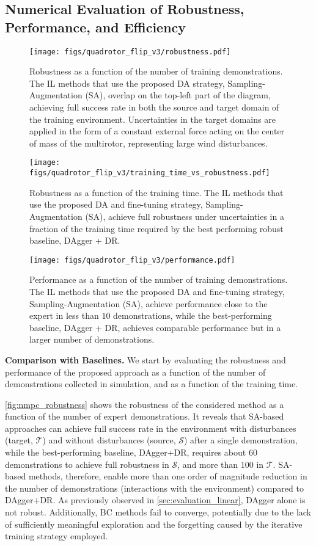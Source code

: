 \subsection{Numerical Evaluation of Robustness, Performance, and Efficiency} 
\begin{figure}
    \centering
    \texttt{[image: figs/quadrotor\_flip\_v3/robustness.pdf]}
    \caption{Robustness as a function of the number of training demonstrations. The \ac{IL} methods that use the proposed \ac{DA} strategy, Sampling-Augmentation (SA), overlap on the top-left part of the diagram, achieving full success rate in both the source and target domain of the training environment. Uncertainties in the target domains are applied in the form of a constant external force acting on the center of mass of the multirotor, representing large wind disturbances.}
    \label{fig:nmpc_robustness}
    \centering
    \texttt{[image: figs/quadrotor\_flip\_v3/training\_time\_vs\_robustness.pdf]}
    \caption{Robustness as a function of the training time. The \ac{IL} methods that use the proposed \ac{DA} and fine-tuning strategy, Sampling-Augmentation (SA), achieve full robustness under uncertainties in a fraction of the training time required by the best performing robust baseline, DAgger + DR.}
    \label{fig:nmpc_efficiency}
    \centering
    \texttt{[image: figs/quadrotor\_flip\_v3/performance.pdf]}
    \caption{Performance as a function of the number of training demonstrations. The \ac{IL} methods that use the proposed \ac{DA} and fine-tuning strategy, Sampling-Augmentation (SA), achieve performance close to the expert in less than $10$ demonstrations, while the best-performing baseline, DAgger + DR, achieves comparable performance but in a larger number of demonstrations.}
    \label{fig:nmpc_performance}
\end{figure}
\noindent

\noindent \textbf{Comparison with Baselines.}
We start by evaluating the robustness and performance of the proposed approach as a function of the number of demonstrations collected in simulation, and as a function of the training time. 

\cref{fig:nmpc_robustness} shows the robustness of the considered method as a function of the number of expert demonstrations. It reveals that \ac{SA}-based approaches can achieve full success rate in the environment with disturbances (target, $\mathcal{T}$) and without disturbances (source, $\mathcal{S}$) after a single demonstration, while the best-performing baseline, \ac{DAgger}+\ac{DR}, requires about $60$ demonstrations to achieve full robustness in $\mathcal{S}$, and more than $100$ in $\mathcal{T}$. \ac{SA}-based methods, therefore, enable more than one order of magnitude reduction in the number of demonstrations (interactions with the environment) compared to \ac{DAgger}+\ac{DR}.
As previously observed in \cref{sec:evaluation_linear}, \ac{DAgger} alone is not robust. 
Additionally, \ac{BC} methods fail to converge, potentially due to the lack of sufficiently meaningful exploration and the forgetting caused by the iterative training strategy employed. 

